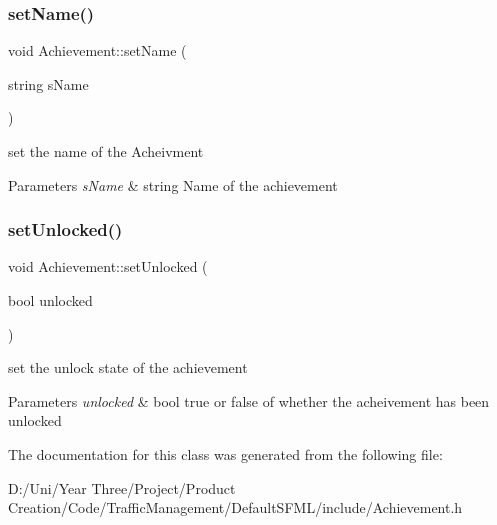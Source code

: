 \subsubsection{\texorpdfstring{set\+Name()}{setName()}}
{\footnotesize\ttfamily void Achievement\+::set\+Name (\begin{DoxyParamCaption}\item[{string}]{s\+Name }\end{DoxyParamCaption})}



set the name of the Acheivment 


\begin{DoxyParams}{Parameters}
{\em s\+Name} & string Name of the achievement \\
\hline
\end{DoxyParams}
\hypertarget{class_achievement_a59aa51eab50fed4fb72eee2ff733e3ac}{}\label{class_achievement_a59aa51eab50fed4fb72eee2ff733e3ac} 
\subsubsection{\texorpdfstring{set\+Unlocked()}{setUnlocked()}}
{\footnotesize\ttfamily void Achievement\+::set\+Unlocked (\begin{DoxyParamCaption}\item[{bool}]{unlocked }\end{DoxyParamCaption})}



set the unlock state of the achievement 


\begin{DoxyParams}{Parameters}
{\em unlocked} & bool true or false of whether the acheivement has been unlocked \\
\hline
\end{DoxyParams}


The documentation for this class was generated from the following file\+:\begin{DoxyCompactItemize}
\item 
D\+:/\+Uni/\+Year Three/\+Project/\+Product Creation/\+Code/\+Traffic\+Management/\+Default\+S\+F\+M\+L/include/Achievement.\+h\end{DoxyCompactItemize}
